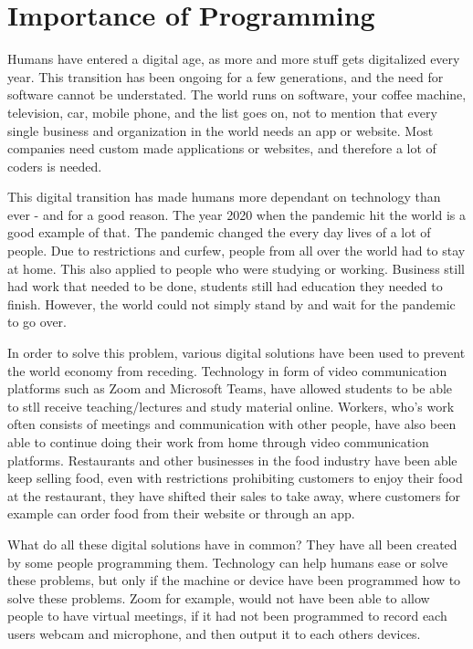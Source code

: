 \section{Importance of Programming} \label{chap:importance_of_programming}

Humans have entered a digital age, as more and more stuff gets 
digitalized every year. This transition has been ongoing for a few 
generations, and the need for software cannot be understated. The 
world runs on software, your coffee machine, television, car, mobile
phone, and the list goes on, not to mention that every single business 
and organization in the world needs an app or website. Most companies
need custom made applications or websites, and therefore a lot of coders
is needed.

This digital transition has made humans more dependant on technology than ever - 
and for a good reason. The year 2020 when the pandemic hit the world is a good example of that.
The pandemic changed the every day lives of a lot of people. Due to restrictions and curfew,
people from all over the world had to stay at home. This also applied to people 
who were studying or working. Business still had work that needed to be done,
students still had education they needed to finish. However, the world could not simply 
stand by and wait for the pandemic to go over. 

In order to solve this problem,
various digital solutions have been used to prevent the world economy from receding. 
Technology in form of video communication platforms such as Zoom and Microsoft Teams,
have allowed students to be able to stll receive teaching/lectures and study material online. 
Workers, who's work often consists of meetings and communication with other people,
have also been able to continue doing their work from home through video communication platforms. 
Restaurants and other businesses in the food industry have been able keep selling food, 
even with restrictions prohibiting customers to enjoy their food at the restaurant, 
they have shifted their sales to take away, where customers for example can order
food from their website or through an app.


What do all these digital solutions have in common? They have all been created by 
some people programming them. Technology can help humans ease or solve these problems, 
but only if the machine or device have been programmed how to solve these problems. 
Zoom for example, would not have been able to allow people to have virtual meetings, 
if it had not been programmed to record each users webcam and microphone, and then output
it to each others devices. 

